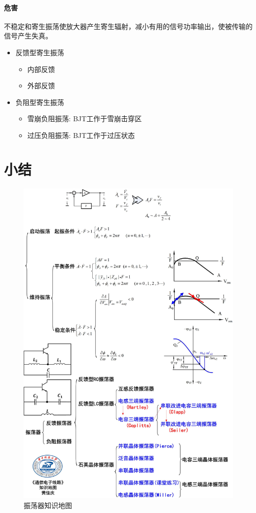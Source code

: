 \documentclass[a4paper]{report}
\begin{document}
\paragraph{危害}不稳定和寄生振荡使放大器产生寄生辐射，减小有用的信号功率输出，使被传输的信号产生失真。
\begin{itemize}
  \item 反馈型寄生振荡
  \begin{itemize}
    \item 内部反馈
    \item 外部反馈
  \end{itemize}
  \item 负阻型寄生振荡
  \begin{itemize}
    \item 雪崩负阻振荡: BJT工作于雪崩击穿区
    \item 过压负阻振荡: BJT工作于过压状态
  \end{itemize}
\end{itemize}
\section{小结}
\begin{figure}
\centering
\includegraphics[width=1\textwidth]{osc_map.jpg}
\caption{振荡器知识地图}
\end{figure}
\end{document}
